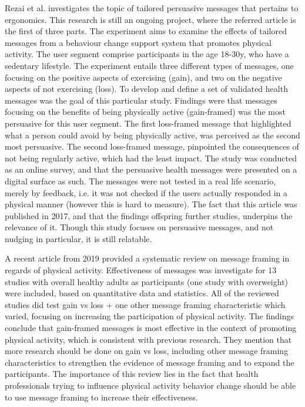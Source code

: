 Rezai et al.
investigates the topic of tailored persuasive messages that pertains to ergonomics. This research is still an ongoing project, where the referred article is the first of three parts. The experiment aims to examine the effects of tailored messages from a behaviour change support system that promotes physical activity. The user segment comprise participants in the age 18-30y, who have a sedentary lifestyle. The experiment entails three different types of messages, one focusing on the positive aspects of exercising (gain), and two on the negative aspects of not exercising (loss). To develop and define a set of validated health messages was the goal of this particular study. Findings were that messages focusing on the benefits of being physically active (gain-framed) was the most persuasive for this user segment. The first loss-framed message that highlighted what a person could avoid by being physically active, was perceived as the second most persuasive. The second loss-framed message, pinpointed the consequences of not being regularly active, which had the least impact. The study was conducted as an online survey, and that the persuasive health messages were presented on a digital surface as such. The messages were not tested in a real life scenario, merely by feedback, i.e. it was not checked if the users actually responded in a physical manner (however this is hard to measure). The fact that this article was published in 2017, and that the findings offspring further studies, underpins the relevance of it. Though this study focuses on persuasive messages, and not nudging in particular, it is still relatable.

A recent article from 2019 
\cite{williams_effects_2019}
provided a systematic review on message framing in regards of physical activity. Effectiveness of messages was investigate for 13 studies with overall healthy adults as participants (one study with overweight) were included, based on quantitative data and statistics. All of the reviewed studies did test gain vs loss + one other message framing characteristic which varied, focusing on increasing the participation of physical activity. The findings conclude that gain-framed messages is most effective in the context of promoting physical activity, which is consistent with previous research. They mention that more research should be done on gain vs loss, including other message framing characteristics to strengthen the evidence of message framing and to expand the participants.
The importance of this review lies in the fact that health professionals trying to influence physical activity behavior change should be able to use message framing to increase their effectiveness.

